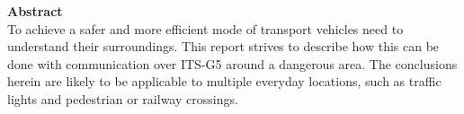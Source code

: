 \newpage
{\textbf{Abstract}}
\\
To achieve a safer and more efficient mode of transport vehicles need to understand their surroundings. This report strives to describe how this can be done with communication over ITS-G5 around a dangerous area. The conclusions herein are likely to be applicable to multiple everyday locations, such as traffic lights and pedestrian or railway crossings.
